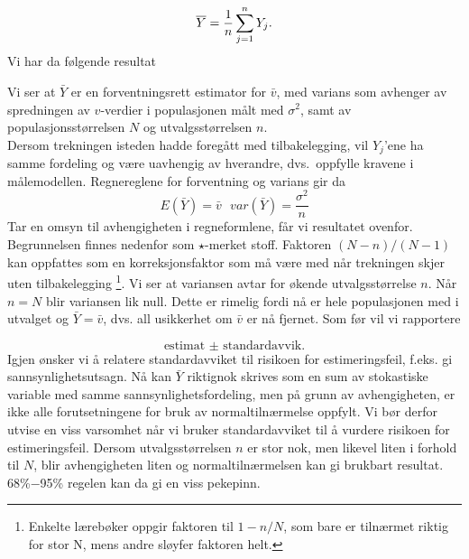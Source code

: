      \[{\bar Y}={1\over n}\sum_{j=1}^n Y_j . \]
Vi har da følgende resultat
\begin{center}  \end{center}

\noindent Vi ser at $\bar{Y}$ er en forventningsrett estimator for $\bar{v}$,
med varians som avhenger av spredningen av $v$-verdier i populasjonen målt
med $\sigma ^2$, samt av populasjonsstørrelsen $N$ og utvalgsstørrelsen
 $n$.\\

 Dersom trekningen isteden hadde foregått med 
tilbakelegging, vil $Y_j$'ene ha samme fordeling og være uavhengig av
hverandre, dvs.\ oppfylle kravene i målemodellen.
Regnereglene for forventning og varians gir da
\[ E(\bar{Y})=\bar{v}\mbox{\ \ \ \ \ } var(\bar{Y})= \frac{\sigma ^2}{n}\]
Tar en omsyn til avhengigheten i regneformlene, får vi resultatet ovenfor.
Begrunnelsen finnes nedenfor som $\star$-merket stoff. 
Faktoren $(N-n)/(N-1)$ kan oppfattes som en korreksjonsfaktor som må
være med når trekningen skjer uten tilbakelegging
\footnote{Enkelte lærebøker oppgir faktoren til $1-n/N$, som 
bare er tilnærmet riktig for stor N, mens andre sløyfer faktoren helt.}.
 Vi ser at variansen avtar for økende utvalgs\-størrelse $n$. Når
$n=N$ blir variansen lik null. Dette er rimelig fordi nå er
hele populasjonen med i utvalget og ${\bar Y}=\bar v$, dvs. all
usikkerhet om $\bar v$ er nå fjernet. Som før vil vi rapportere

\[   \mbox{estimat $\pm$ standardavvik.} \]
Igjen ønsker vi å relatere standardavviket til risikoen
for estimeringsfeil, f.eks. gi sannsynlighetsutsagn. Nå kan
$\bar Y$ riktignok skrives som en sum av stokastiske variable med
samme sannsynlighetsfordeling, men på grunn av avhengigheten,
er ikke alle forutsetningene for bruk av normaltilnærmelse
oppfylt. Vi bør derfor utvise en viss varsomhet når vi
bruker standardavviket til å vurdere risikoen for
estimeringsfeil. Dersom utvalgsstørrelsen $n$ er stor nok, men
likevel liten i forhold til $N$, blir avhengigheten liten og
normaltilnærmelsen kan gi brukbart resultat. 68\%$-$95\%
regelen kan da gi en viss pekepinn.\\

